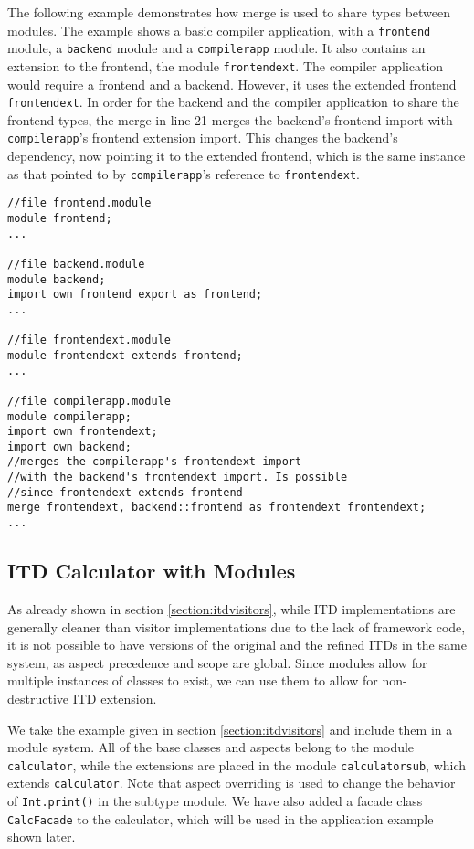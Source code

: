 The following example demonstrates how merge is used to share types between modules. The example
shows a basic compiler application, with a \texttt{frontend} module, a \texttt{backend} module
and a \texttt{compilerapp} module. It also contains an extension to the frontend, the module 
\texttt{frontendext}. The compiler application would require a frontend and a backend. 
However, it uses the extended frontend \texttt{frontendext}. In order for the backend and the
compiler application to share the frontend types, the merge in line 21 merges the backend's
frontend import with \texttt{compilerapp}'s frontend extension import. This changes the backend's
dependency, now pointing it to the extended frontend, which is the same instance as that pointed
to by \texttt{compilerapp}'s reference to \texttt{frontendext}.


\begin{lstlisting}[caption={Merge}]
//file frontend.module
module frontend;
...

//file backend.module
module backend;
import own frontend export as frontend;
...

//file frontendext.module
module frontendext extends frontend;
...

//file compilerapp.module
module compilerapp;
import own frontendext;
import own backend;
//merges the compilerapp's frontendext import 
//with the backend's frontendext import. Is possible
//since frontendext extends frontend
merge frontendext, backend::frontend as frontendext frontendext;
...
\end{lstlisting}

\subsection{ITD Calculator with Modules}

As already shown in section \ref{section:itdvisitors}, while ITD implementations
are generally cleaner than visitor implementations due to the lack of framework code,
it is not possible to have versions of the original and the refined
ITDs in the same system, as aspect precedence and scope are global. Since modules
allow for multiple instances of classes to exist, we can use them to allow for
non-destructive ITD extension. 

We take the example given in section \ref{section:itdvisitors} and include them in a module system.
All of the base classes and aspects belong to the module \texttt{calculator}, while the extensions
are placed in the module \texttt{calculatorsub}, which extends \texttt{calculator}. Note that
aspect overriding is used to change the behavior of \texttt{Int.print()} in the subtype module.
We have also added a facade class \texttt{CalcFacade} to the calculator, which will be used
in the application example shown later.

